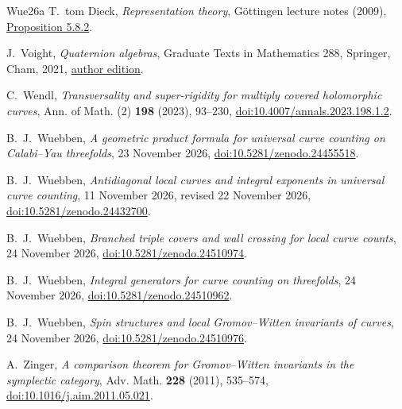 \begin{thebibliography}{Wue26a}
 T.~tom Dieck,
\emph{Representation theory}, G\"ottingen lecture notes (2009),
\href{https://ncatlab.org/nlab/files/tomDieckRepresentationTheory.pdf}{Proposition 5.8.2}.

 J.~Voight, \emph{Quaternion algebras}, Graduate Texts in Mathematics 288, Springer, Cham, 2021, \href{https://jvoight.github.io/quat-book.pdf}{author edition}.

 C.~Wendl,
\emph{Transversality and super-rigidity for multiply covered holomorphic curves},
Ann. of Math. (2) \textbf{198} (2023), 93--230,
\href{https://doi.org/10.4007/annals.2023.198.1.2}{doi:10.4007/annals.2023.198.1.2}.

 B.~J.~Wuebben,
\emph{A geometric product formula for universal curve counting on Calabi--Yau threefolds}, 23 November 2026,
\href{https://doi.org/10.5281/zenodo.24455518}{doi:10.5281/zenodo.24455518}.

 B.~J.~Wuebben,
\emph{Antidiagonal local curves and integral exponents in universal curve counting}, 11 November 2026, revised 22 November 2026,
\href{https://doi.org/10.5281/zenodo.24432700}{doi:10.5281/zenodo.24432700}.

 B.~J.~Wuebben,
\emph{Branched triple covers and wall crossing for local curve counts}, 24 November 2026,
\href{https://doi.org/10.5281/zenodo.24510974}{doi:10.5281/zenodo.24510974}.

 B.~J.~Wuebben,
\emph{Integral generators for curve counting on threefolds}, 24 November 2026,
\href{https://doi.org/10.5281/zenodo.24510962}{doi:10.5281/zenodo.24510962}.

 B.~J.~Wuebben,
\emph{Spin structures and local Gromov--Witten invariants of curves}, 24 November 2026,
\href{https://doi.org/10.5281/zenodo.24510976}{doi:10.5281/zenodo.24510976}.

 A.~Zinger,
\emph{A comparison theorem for Gromov--Witten invariants in the
symplectic category}, Adv. Math. \textbf{228} (2011), 535--574,
\href{https://doi.org/10.1016/j.aim.2011.05.021}{doi:10.1016/j.aim.2011.05.021}.

\end{thebibliography}
